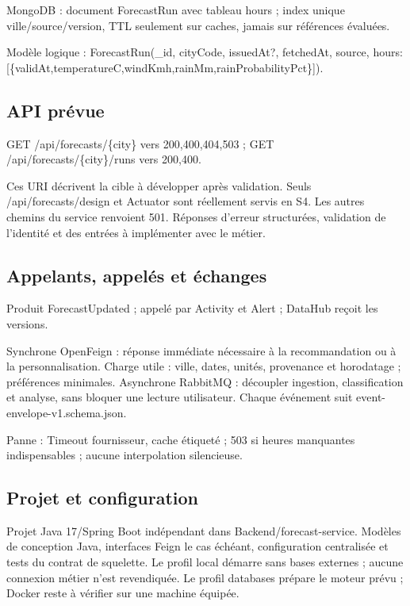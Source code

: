\documentclass[10pt,a4paper]{article}
\begin{document}
MongoDB : document ForecastRun avec tableau hours ; index unique ville/source/version, TTL seulement sur caches, jamais sur références évaluées.\par

Modèle logique : ForecastRun(\_id, cityCode, issuedAt?, fetchedAt, source, hours:[\{validAt,temperatureC,windKmh,rainMm,rainProbabilityPct\}]).\par

\subsection*{API prévue}

GET /api/forecasts/\{city\}  vers  200,400,404,503 ; GET /api/forecasts/\{city\}/runs  vers  200,400.\par

Ces URI décrivent la cible à développer après validation. Seuls /api/forecasts/design et Actuator sont réellement servis en S4. Les autres chemins du service renvoient 501. Réponses d'erreur structurées, validation de l'identité et des entrées à implémenter avec le métier.\par

\subsection*{Appelants, appelés et échanges}

Produit ForecastUpdated ; appelé par Activity et Alert ; DataHub reçoit les versions.\par

Synchrone OpenFeign : réponse immédiate nécessaire à la recommandation ou à la personnalisation. Charge utile : ville, dates, unités, provenance et horodatage ; préférences minimales. Asynchrone RabbitMQ : découpler ingestion, classification et analyse, sans bloquer une lecture utilisateur. Chaque événement suit event-envelope-v1.schema.json.\par

Panne : Timeout fournisseur, cache étiqueté ; 503 si heures manquantes indispensables ; aucune interpolation silencieuse.\par

\subsection*{Projet et configuration}

Projet Java 17/Spring Boot indépendant dans Backend/forecast-service. Modèles de conception Java, interfaces Feign le cas échéant, configuration centralisée et tests du contrat de squelette. Le profil local démarre sans bases externes ; aucune connexion métier n'est revendiquée. Le profil databases prépare le moteur prévu ; Docker reste à vérifier sur une machine équipée.\par
\clearpage
\end{document}
